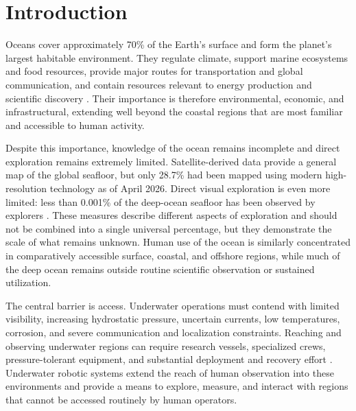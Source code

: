 \documentclass{uhcoethesis}
\begin{document}
\tableofcontents
\newpage
\listoftables
\newpage
\listoffigures

\mainmatter
\chapter{Introduction}
Oceans cover approximately 70\% of the Earth's surface and form the planet's largest habitable environment. They regulate climate, support marine ecosystems and food resources, provide major routes for transportation and global communication, and contain resources relevant to energy production and scientific discovery \cite{NationalGeographic2024,NOAA2026}. Their importance is therefore environmental, economic, and infrastructural, extending well beyond the coastal regions that are most familiar and accessible to human activity.

Despite this importance, knowledge of the ocean remains incomplete and direct exploration remains extremely limited. Satellite-derived data provide a general map of the global seafloor, but only 28.7\% had been mapped using modern high-resolution technology as of April 2026. Direct visual exploration is even more limited: less than 0.001\% of the deep-ocean seafloor has been observed by explorers \cite{NOAA2026}. These measures describe different aspects of exploration and should not be combined into a single universal percentage, but they demonstrate the scale of what remains unknown. Human use of the ocean is similarly concentrated in comparatively accessible surface, coastal, and offshore regions, while much of the deep ocean remains outside routine scientific observation or sustained utilization.

The central barrier is access. Underwater operations must contend with limited visibility, increasing hydrostatic pressure, uncertain currents, low temperatures, corrosion, and severe communication and localization constraints. Reaching and observing underwater regions can require research vessels, specialized crews, pressure-tolerant equipment, and substantial deployment and recovery effort \cite{Shukla2016,Mcleod2012,Patel2024}. Underwater robotic systems extend the reach of human observation into these environments and provide a means to explore, measure, and interact with regions that cannot be accessed routinely by human operators.
\end{document}
